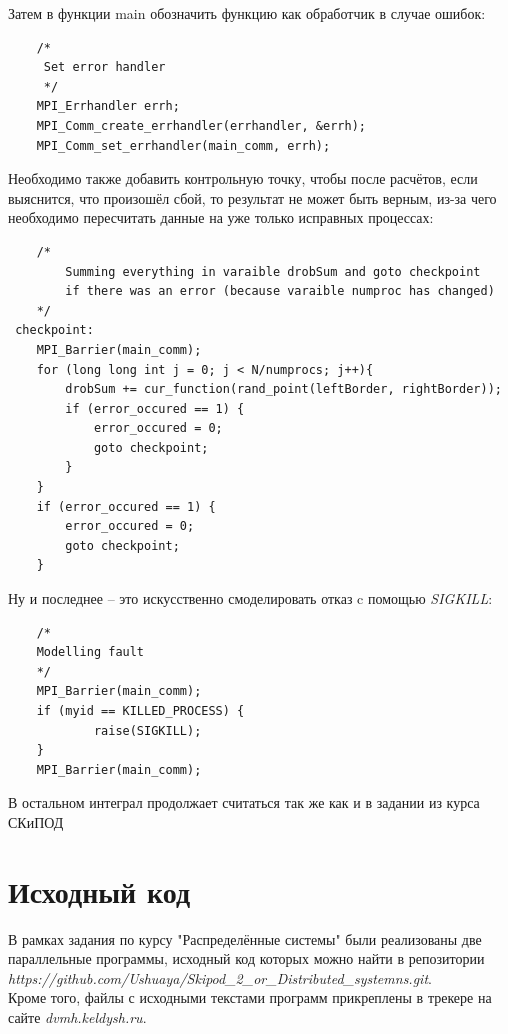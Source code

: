 \documentclass[a4paper]{article}
\begin{document}
\newpage
Затем в функции main обозначить функцию как обработчик в случае ошибок:
\begin{lstlisting}
 	/*
     Set error handler
     */
    MPI_Errhandler errh;
    MPI_Comm_create_errhandler(errhandler, &errh);
    MPI_Comm_set_errhandler(main_comm, errh);
\end{lstlisting}

Необходимо также добавить контрольную точку, чтобы после расчётов, если выяснится, что произошёл сбой, то результат не может быть верным, из-за чего необходимо пересчитать данные на уже только исправных процессах:\\ 
\begin{lstlisting}
	/*
	    Summing everything in varaible drobSum and goto checkpoint 
	    if there was an error (because varaible numproc has changed)
    */
 checkpoint:
    MPI_Barrier(main_comm);
    for (long long int j = 0; j < N/numprocs; j++){
        drobSum += cur_function(rand_point(leftBorder, rightBorder));
        if (error_occured == 1) {
            error_occured = 0;
            goto checkpoint;
        }
    }
    if (error_occured == 1) {
        error_occured = 0;
        goto checkpoint;
    }

\end{lstlisting}

Ну и последнее -- это искусственно смоделировать отказ c помощью \textit{SIGKILL}:\\ 
\begin{lstlisting}
	/*
    Modelling fault
    */
    MPI_Barrier(main_comm);
    if (myid == KILLED_PROCESS) {
            raise(SIGKILL);
    }
    MPI_Barrier(main_comm);

\end{lstlisting}


В остальном интеграл продолжает считаться так же как и в задании из курса СКиПОД


\section{Исходный код}
В рамках задания по курсу "Распределённые системы" были реализованы две параллельные программы, исходный код которых можно найти в репозитории \\
\textit{https://github.com/Ushuaya/Skipod\_2\_or\_Distributed\_systemns.git}. 
\\Кроме того, файлы с исходными текстами программ прикреплены в трекере на сайте \textit{dvmh.keldysh.ru}.
\end{document}
